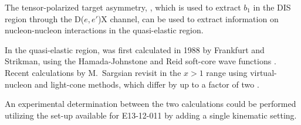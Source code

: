 

The tensor-polarized target asymmetry, \Azz, which is used to extract $b_1$ in the DIS region through the D($e,e'$)X channel, can be used to extract information on nucleon-nucleon interactions in the quasi-elastic region. 

In the quasi-elastic region, \Azz was first calculated in 1988 by Frankfurt and Strikman, using the Hamada-Johnstone and Reid soft-core wave functions \cite{Frankfurt:1988nt}. Recent calculations by {M.~Sargsian} revisit \Azz in the $x>1$ range using virtual-nucleon and light-cone methods, which differ by up to a factor of two \cite{MISAK}.



An experimental determination between the two calculations could be performed utilizing the set-up available for E13-12-011 by adding a single kinematic setting.
